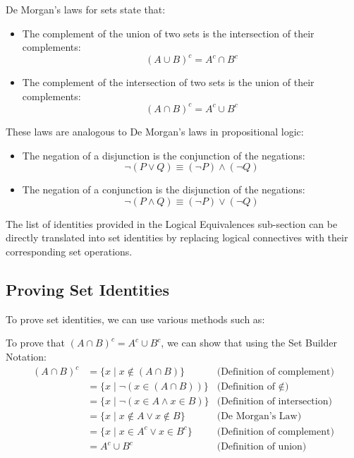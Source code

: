 \begin{eg}
    De Morgan's laws for sets state that:
    \begin{itemize}[itemsep=1pt,label=$\circ$]
        \item The complement of the union of two sets is the intersection of their complements:
        \[ (A \cup B)^c = A^c \cap B^c \]
        \item The complement of the intersection of two sets is the union of their complements:
        \[ (A \cap B)^c = A^c \cup B^c \]
    \end{itemize}
    These laws are analogous to De Morgan's laws in propositional logic:
    \begin{itemize}[itemsep=1pt,label=$\circ$]
        \item The negation of a disjunction is the conjunction of the negations:
        \[ \neg (P \lor Q) \equiv (\neg P) \land (\neg Q) \]
        \item The negation of a conjunction is the disjunction of the negations:
        \[ \neg (P \land Q) \equiv (\neg P) \lor (\neg Q) \]
    \end{itemize}
\end{eg}
The list of identities provided in the Logical Equivalences sub-section can be directly translated into set identities by replacing logical connectives with their corresponding set operations.

\subsection{Proving Set Identities}
To prove set identities, we can use various methods such as:
\begin{eg}
    To prove that $(A \cap B)^c = A^c \cup B^c$, we can show that using the Set Builder Notation:
    \begin{align*}
        (A \cap B)^c &= \{x \mid x \notin (A \cap B)\} &\text{(Definition of complement)}\\
        &= \{x \mid \neg (x \in (A \cap B))\} &\text{(Definition of $\notin$)}\\
        &= \{x \mid \neg (x \in A \land x \in B)\} &\text{(Definition of intersection)}\\
        &= \{x \mid x \notin A \lor x \notin B\} &\text{(De Morgan's Law)}\\
        &= \{x \mid x \in A^c \lor x \in B^c\} &\text{(Definition of complement)}\\
        &= A^c \cup B^c &\text{(Definition of union)}
    \end{align*}
\end{eg}

